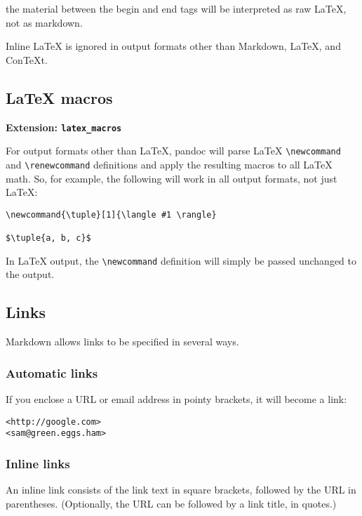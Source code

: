 \documentclass[]{article}
\begin{document}
the material between the begin and end tags will be interpreted as raw
LaTeX, not as markdown.

Inline LaTeX is ignored in output formats other than Markdown, LaTeX,
and ConTeXt.

\subsection{LaTeX macros}\label{latex-macros}

\textbf{Extension: \texttt{latex\_macros}}

For output formats other than LaTeX, pandoc will parse LaTeX
\texttt{\textbackslash{}newcommand} and
\texttt{\textbackslash{}renewcommand} definitions and apply the
resulting macros to all LaTeX math. So, for example, the following will
work in all output formats, not just LaTeX:

\begin{verbatim}
\newcommand{\tuple}[1]{\langle #1 \rangle}

$\tuple{a, b, c}$
\end{verbatim}

In LaTeX output, the \texttt{\textbackslash{}newcommand} definition will
simply be passed unchanged to the output.

\subsection{Links}\label{links}

Markdown allows links to be specified in several ways.

\subsubsection{Automatic links}\label{automatic-links}

If you enclose a URL or email address in pointy brackets, it will become
a link:

\begin{verbatim}
<http://google.com>
<sam@green.eggs.ham>
\end{verbatim}

\subsubsection{Inline links}\label{inline-links}

An inline link consists of the link text in square brackets, followed by
the URL in parentheses. (Optionally, the URL can be followed by a link
title, in quotes.)
\end{document}
